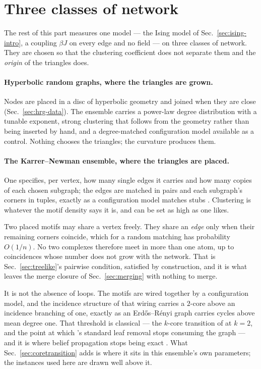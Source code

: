 \section{Three classes of network}
\label{sec:threeclasses}

The rest of this part measures one model --- the Ising model of
Sec.~\ref{sec:ising-intro}, a coupling $\beta J$ on every edge and no field ---
on three classes of network. They are chosen so that the clustering coefficient
does not separate them and the \emph{origin} of the triangles does.

\paragraph{Hyperbolic random graphs, where the triangles are grown.} Nodes are
placed in a disc of hyperbolic geometry and joined when they are close
(Sec.~\ref{sec:hrg-data}). The ensemble carries a power-law degree distribution
with a tunable exponent, strong clustering that follows from the geometry rather
than being inserted by hand, and a degree-matched configuration model available
as a control. Nothing chooses the triangles; the curvature produces them.

\paragraph{The Karrer--Newman ensemble, where the triangles are placed.} One
specifies, per vertex, how many single edges it carries and how many copies of
each chosen subgraph; the edges are matched in pairs and each subgraph's corners
in tuples, exactly as a configuration model matches stubs
\citep{karrer2010}. Clustering is whatever the motif density says it is, and can
be set as high as one likes.

Two placed motifs may share a vertex freely. They share an \emph{edge} only when
their remaining corners coincide, which for a random matching has probability
$O(1/n)$. No two complexes therefore meet in more than one atom, up to
coincidences whose number does not grow with the network. That is
Sec.~\ref{sec:treelike}'s pairwise condition, satisfied by construction, and it
is what leaves the merge closure of Sec.~\ref{sec:merging} with nothing to
merge.

It is not the absence of loops. The motifs are wired together by a
configuration model, and the incidence structure of that wiring carries a
$2$-core above an incidence branching of one, exactly as an Erd\H{o}s--R\'enyi
graph carries cycles above mean degree one. That threshold is classical --- the
$k$-core transition of \citet{pittel1996} at $k=2$, and the point at which
\citeauthor{bauer2001}'s standard leaf removal stops consuming the graph
\citep{bauer2001} --- and it is where belief propagation stops being exact
\citep{mezard2009}. What Sec.~\ref{sec:coretransition} adds is where it sits in
this ensemble's own parameters; the instances used here are drawn well above it.


